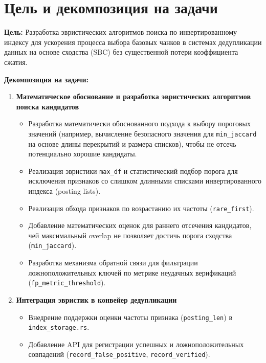 \documentclass[a4paper,14pt]{extarticle}
\begin{document}
\section*{Цель и декомпозиция на задачи}

\textbf{Цель:} Разработка эвристических алгоритмов поиска по инвертированному индексу для ускорения процесса выбора базовых чанков в системах дедупликации данных на основе сходства (SBC) без существенной потери коэффициента сжатия.

\textbf{Декомпозиция на задачи:}

\begin{enumerate}
    \item \textbf{Математическое обоснование и разработка эвристических алгоритмов поиска кандидатов}
    \begin{itemize}
        \item Разработка математически обоснованного подхода к выбору пороговых значений (например, вычисление безопасного значения для \texttt{min\_jaccard} на основе длины перекрытий и размера списков), чтобы не отсечь потенциально хорошие кандидаты.
        \item Реализация эвристики \texttt{max\_df} и статистический подбор порога для исключения признаков со слишком длинными списками инвертированного индекса (posting lists).
        \item Реализация обхода признаков по возрастанию их частоты (\texttt{rare\_first}).
        \item Добавление математических оценок для раннего отсечения кандидатов, чей максимальный overlap не позволяет достичь порога сходства (\texttt{min\_jaccard}).
        \item Разработка механизма обратной связи для фильтрации ложноположительных ключей по метрике неудачных верификаций (\texttt{fp\_metric\_threshold}).
    \end{itemize}
    
    \item \textbf{Интеграция эвристик в конвейер дедупликации}
    \begin{itemize}
        \item Внедрение поддержки оценки частоты признака (\texttt{posting\_len}) в \texttt{index\_storage.rs}.
        \item Добавление API для регистрации успешных и ложноположительных совпадений (\texttt{record\_false\_positive}, \texttt{record\_verified}).
    \end{itemize}
    

\end{enumerate}
\end{document}
